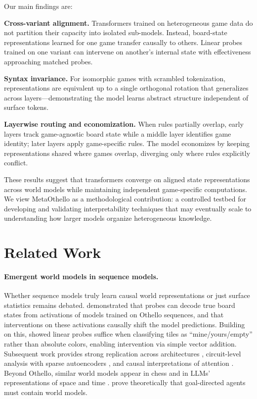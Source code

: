 \documentclass{article}
\theoremstyle{plain}
\theoremstyle{definition}
\theoremstyle{remark}
\begin{document}
Our main findings are: 

\textbf{Cross-variant alignment.} Transformers trained on heterogeneous game data do not partition their capacity into isolated sub-models. Instead, board-state representations learned for one game transfer causally to others. Linear probes trained on one variant can intervene on another's internal state with effectiveness approaching matched probes. 

\textbf{Syntax invariance.} For isomorphic games with scrambled tokenization, representations are equivalent up to a single orthogonal rotation that generalizes across layers---demonstrating the model learns abstract structure independent of surface tokens. 

\textbf{Layerwise routing and economization.} When rules partially overlap, early layers track game-agnostic board state while a middle layer identifies game identity; later layers apply game-specific rules. The model economizes by keeping representations shared where games overlap, diverging only where rules explicitly conflict.

These results suggest that transformers converge on aligned state representations across world models while maintaining independent game-specific computations. We view MetaOthello as a methodological contribution: a controlled testbed for developing and validating interpretability techniques that may eventually scale to understanding how larger models organize heterogeneous knowledge.

\section{Related Work}


\paragraph{Emergent world models in sequence models.} Whether sequence models truly learn causal world representations or just surface statistics remains debated. \citet{li_emergent_2024} demonstrated that probes can decode true board states from activations of models trained on Othello sequences, and that interventions on these activations causally shift the model predictions. Building on this, \citet{nanda_emergent_2023} showed linear probes suffice when classifying tiles as ``mine/yours/empty'' rather than absolute colors, enabling intervention via simple vector addition. Subsequent work provides strong replication across architectures \cite{yuan_revisiting_2025}, circuit-level analysis with sparse autoencoders \cite{wong_othellogpt_2025}, and causal interpretations of attention \cite{rohekar_causal_2025}. Beyond Othello, similar world models appear in chess \cite{karvonen_emergent_2024} and in LLMs' representations of space and time \cite{gurnee_language_2023}. \citet{richens_general_2025} prove theoretically that goal-directed agents must contain world models.
\end{document}
